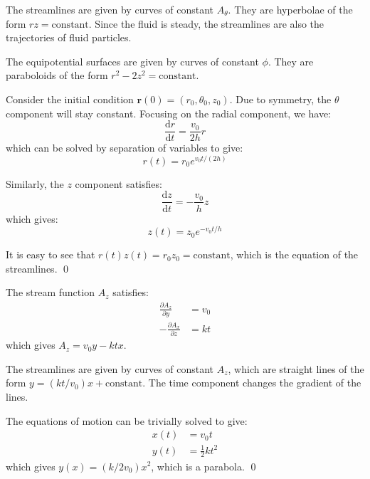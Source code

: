 \documentclass[12pt]{article}
\begin{document}
The streamlines are given by curves of constant $A_{\theta}$. They are hyperbolae of the form $r z = \text{constant}$. Since the fluid is steady, the streamlines are also the trajectories of fluid particles.

The equipotential surfaces are given by curves of constant $\phi$. They are paraboloids of the form $r^{2} - 2z^{2} = \text{constant}$.

Consider the initial condition $\mathbf{r}(0) = (r_{0}, \theta_{0}, z_{0})$. Due to symmetry, the $\theta$ component will stay constant. Focusing on the radial component, we have:
\begin{equation}
    \frac{\mathrm{d}r}{\mathrm{d}t} = \frac{v_{0}}{2h} r
\end{equation}
which can be solved by separation of variables to give:
\begin{equation}
    r(t) = r_{0} e^{v_{0} t/(2h)}
\end{equation}

Similarly, the $z$ component satisfies:
\begin{equation}
    \frac{\mathrm{d}z}{\mathrm{d}t} = -\frac{v_{0}}{h} z
\end{equation}
which gives:
\begin{equation}
    z(t) = z_{0} e^{-v_{0} t/h}
\end{equation}

It is easy to see that $r(t) z(t) = r_{0} z_{0} = \text{constant}$, which is the equation of the streamlines.
\qed



The stream function $A_{z}$ satisfies:
\begin{equation}
    \begin{split}
        \frac{\partial A_{z}}{\partial y} &= v_{0} \\
        -\frac{\partial A_{x}}{\partial z} &= kt
    \end{split}
\end{equation}
which gives $A_{z} = v_{0}y - ktx$.

The streamlines are given by curves of constant $A_{z}$, which are straight lines of the form $y = (kt/v_{0}) x + \text{constant}$. The time component changes the gradient of the lines.

The equations of motion can be trivially solved to give:
\begin{equation}
    \begin{split}
        x(t) &= v_{0} t \\
        y(t) &= \frac{1}{2} kt^{2}
    \end{split}
\end{equation}
which gives $y(x) = (k/2v_{0}) x^{2}$, which is a parabola.
\qed
\end{document}

